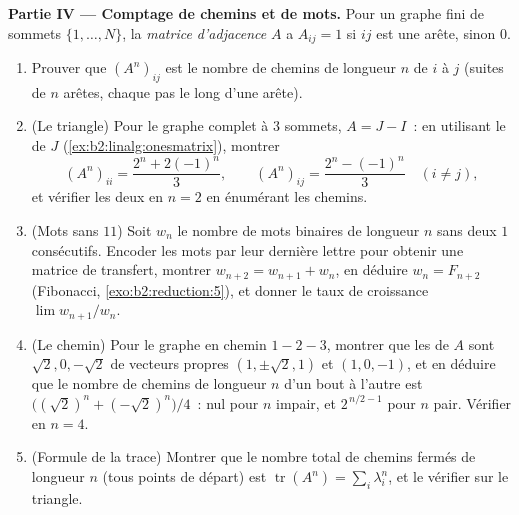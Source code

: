 \begin{problem}
\medskip
\noindent\textbf{Partie IV --- Comptage de chemins et de mots.} Pour
un graphe fini de sommets $\{1, \dots, N\}$, la \emph{matrice
d'adjacence} $A$ a $A_{ij} = 1$ si $ij$ est une arête, sinon $0$.
\begin{enumerate}[resume]
  \item Prouver que $(A^n)_{ij}$ est le nombre de chemins de longueur
        $n$ de $i$ à $j$ (suites de $n$ arêtes, chaque pas le long
        d'une arête).
  \item (Le triangle) Pour le graphe complet à $3$ sommets, $A = J -
        I$~: en utilisant le  de $J$
        (\cref{ex:b2:linalg:onesmatrix}), montrer
        \[
        (A^n)_{ii} = \frac{2^n + 2(-1)^n}{3},
        \qquad
        (A^n)_{ij} = \frac{2^n - (-1)^n}{3} \quad (i \neq j),
        \]
        et vérifier les deux en $n = 2$ en énumérant les chemins.
  \item (Mots sans $11$) Soit $w_n$ le nombre de mots binaires de
        longueur $n$ sans deux $1$ consécutifs. Encoder les mots par
        leur dernière lettre pour obtenir une matrice de transfert,
        montrer $w_{n+2} = w_{n+1} + w_n$, en déduire $w_n = F_{n+2}$
        (Fibonacci, \cref{exo:b2:reduction:5}), et donner le taux de
        croissance $\lim w_{n+1}/w_n$.
  \item (Le chemin) Pour le graphe en chemin $1 - 2 - 3$, montrer que
        les  de $A$ sont $\sqrt2, 0, -\sqrt2$ de
        vecteurs propres $(1, \pm\sqrt2, 1)$ et $(1, 0, -1)$, et en
        déduire que le nombre de chemins de longueur $n$ d'un bout à
        l'autre est $\bigl((\sqrt2)^n + (-\sqrt2)^n\bigr)/4$~: nul
        pour $n$ impair, et $2^{\,n/2 - 1}$ pour $n$ pair. Vérifier en
        $n = 4$.
  \item (Formule de la trace) Montrer que le nombre total de chemins
        fermés de longueur $n$ (tous points de départ) est
        $\operatorname{tr}(A^n) = \sum_i \lambda_i^n$, et le vérifier
        sur le triangle.
\end{enumerate}


\end{problem}

